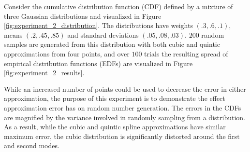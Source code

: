 
Consider the cumulative distribution function (CDF) defined by a
mixture of three Gaussian distributions and visualized in Figure
\ref{fig:experiment_2_distribution}. The distributions have weights
$(.3, .6, .1)$, means $(.2, .45, .85)$ and standard deviations $(.05,
.08, .03)$. $200$ random samples are generated from this distribution
with both cubic and quintic approximations from four points, and over
$100$ trials the resulting spread of empirical distribution functions
(EDFs) are visualized in Figure \ref{fig:experiment_2_results}.

While an increased number of points could be used to decrease the
error in either approximation, the purpose of this experiment is to
demonstrate the effect approximation error has on random number
generation. The errors in the CDFs are magnified by the variance
involved in randomly sampling from a distribution. As a result, while
the cubic and quintic spline approximations have similar maximum
error, the cubic distribution is significantly distorted around the
first and second modes.



